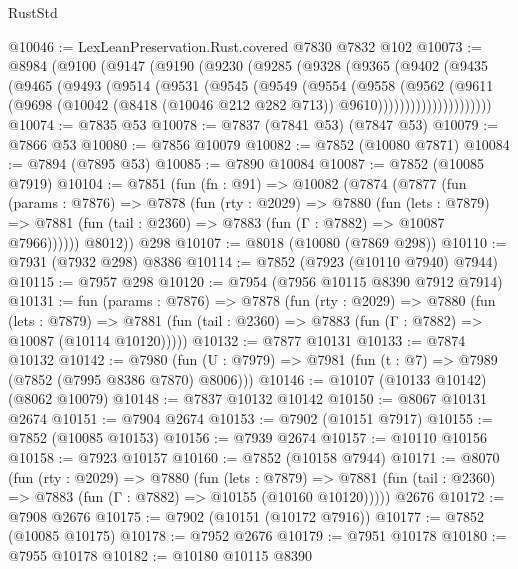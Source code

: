 \begin{lexlean}{RustStd}
\begin{coremodule}
@10046 := LexLeanPreservation.Rust.covered @7830 @7832 @102
@10073 := @8984
    (@9100
      (@9147
        (@9190
          (@9230
            (@9285
              (@9328
                (@9365
                  (@9402
                    (@9435
                      (@9465
                        (@9493
                          (@9514
                            (@9531
                              (@9545
                                (@9549
                                  (@9554
                                    (@9558
                                      (@9562
                                        (@9611
                                          (@9698
                                            (@10042
                                              (@8418 (@10046 @212 @282 @713))
                                              @9610)))))))))))))))))))))
@10074 := @7835 @53
@10078 := @7837 (@7841 @53) (@7847 @53)
@10079 := @7866 @53
@10080 := @7856 @10079
@10082 := @7852 (@10080 @7871)
@10084 := @7894 (@7895 @53)
@10085 := @7890 @10084
@10087 := @7852 (@10085 @7919)
@10104 := @7851
    (fun (fn : @91) =>
    @10082
      (@7874
        (@7877
          (fun (params : @7876) =>
          @7878
            (fun (rty : @2029) =>
            @7880
              (fun (lets : @7879) =>
              @7881 (fun (tail : @2360) => @7883 (fun (Γ : @7882) => @10087 @7966))))))
        @8012))
    @298
@10107 := @8018 (@10080 (@7869 @298))
@10110 := @7931 (@7932 @298) @8386
@10114 := @7852 (@7923 (@10110 @7940) @7944)
@10115 := @7957 @298
@10120 := @7954 (@7956 @10115 @8390 @7912 @7914)
@10131 := fun (params : @7876) =>
  @7878
    (fun (rty : @2029) =>
    @7880
      (fun (lets : @7879) =>
      @7881 (fun (tail : @2360) => @7883 (fun (Γ : @7882) => @10087 (@10114 @10120)))))
@10132 := @7877 @10131
@10133 := @7874 @10132
@10142 := @7980 (fun (U : @7979) => @7981 (fun (t : @7) => @7989 (@7852 (@7995 @8386 @7870) @8006)))
@10146 := @10107 (@10133 @10142) (@8062 @10079)
@10148 := @7837 @10132 @10142
@10150 := @8067 @10131 @2674
@10151 := @7904 @2674
@10153 := @7902 (@10151 @7917)
@10155 := @7852 (@10085 @10153)
@10156 := @7939 @2674
@10157 := @10110 @10156
@10158 := @7923 @10157
@10160 := @7852 (@10158 @7944)
@10171 := @8070
    (fun (rty : @2029) =>
    @7880
      (fun (lets : @7879) =>
      @7881 (fun (tail : @2360) => @7883 (fun (Γ : @7882) => @10155 (@10160 @10120)))))
    @2676
@10172 := @7908 @2676
@10175 := @7902 (@10151 (@10172 @7916))
@10177 := @7852 (@10085 @10175)
@10178 := @7952 @2676
@10179 := @7951 @10178
@10180 := @7955 @10178
@10182 := @10180 @10115 @8390

\end{coremodule}
\end{lexlean}
